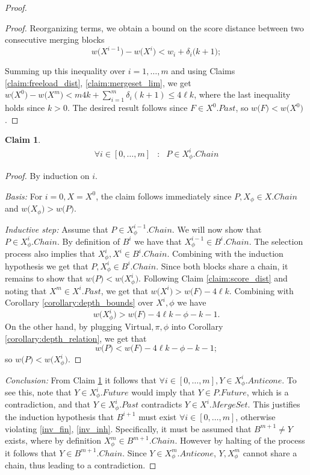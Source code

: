 \documentclass{article}
\theoremstyle{plain}
\theoremstyle{definition}
\newtheorem{claim}[]{Claim}
\theoremstyle{remark}
\newcommand{\score}[1]{{w\bigl(#1\bigr)}}
\newcommand{\virt}{\mbox{Virtual}}
\newcommand{\comma}[2]{
    \begin{aligned}#1 & : & #2\end{aligned}
}
\begin{document}
\begin{proof}
\begin{proof}
        Reorganizing terms, we obtain a bound on the score distance between two consecutive merging blocks $$\score{X^{i-1}} - \score{X^{i}} < w_i + \delta_{i} \bigl(k+1\bigr);$$  
        
        Summing up this inequality over $i=1, \dots, m$ and using Claims \ref{claim:freeload_dist}, \ref{claim:mergeset_lim}, we get $\score{X^0} - \score{X^m} < m 4 k + \sum_{i=1}^m \delta_i (k+1) \le 4 \ell k$, where the last inequality holds since $k > 0$. The desired result follows since $F \in X^0.Past$, so $ \score{F} < \score{X^0}$.
    \end{proof}
    
    \begin{claim} \label{claim:finality_violated}
        $$\comma{\forall i \in [0, \dots, m]}{P \in X^i_\phi.Chain}$$
    \end{claim}
    
    \begin{proof}
        By induction on $i$. 
        
        \emph{Basis:} For $i=0, X = X^0$, the claim follows immediately since $ P, X_\phi \in X.Chain$ and $\score{X_\phi} > \score{P}$.  
        
        \emph{Inductive step:} 
        Assume that $P \in X^{i-1}_\phi.Chain$. We will now show that $P \in X^{i}_\phi.Chain$.
        By definition of $B^i$ we have that $X^{i-1}_\phi \in B^i.Chain$. The selection process also implies that $X^{i}_\phi, X^{i} \in B^i.Chain$.
        Combining with the induction hypothesis we get that $P, X^{i}_\phi \in B^i.Chain$. Since both blocks share a chain, it remains to show that $\score{P} < \score{X^{i}_\phi}$. 
        Following Claim \ref{claim:score_dist} and noting that $X^m \in X^i.Past$, we get that $\score{X^i} > \score{F} - 4 \ell k$. Combining with Corollary \ref{corollary:depth_bounds} over $X^i, \phi$ we have $$\score{X^i_\phi} > \score{F} - 4 \ell k - \phi - k - 1.$$ On the other hand, by plugging $\virt, \pi, \phi$ into Corollary \ref{corollary:depth_relation}, we get that $$\score{P} < \score{F} - 4 \ell k - \phi - k - 1;$$ so $\score{P} < \score{X^{i}_\phi}$. 
        
        
    \end{proof}
    
    \emph{Conclusion:} From Claim \ref{claim:finality_violated} it follows that $\forall i \in [0, \dots, m], Y \in X^i_\phi.Anticone$. To see this, note that $Y \in X^i_\phi.Future$ would imply that $Y \in P.Future$, which is a contradiction, and that $Y \in X^i_\phi.Past$ contradicts $Y \in X^i.MergeSet$. This justifies the induction hypothesis that $B^{i+1}$ must exist $\forall i \in [0, \dots, m]$, otherwise violating \ref{inv_fin}, \ref{inv_inh}. 
    Specifically, it must be assumed that $B^{m+1} \ne Y$ exists, where by definition $X^m_\phi \in B^{m+1}.Chain$. However by halting of the process it follows that $Y \in B^{m+1}.Chain$. Since $Y \in X^m_\phi.Anticone$, $Y,  X^m_\phi$ cannot share a chain, thus leading to a contradiction. 
    
\end{proof}
\end{document}
